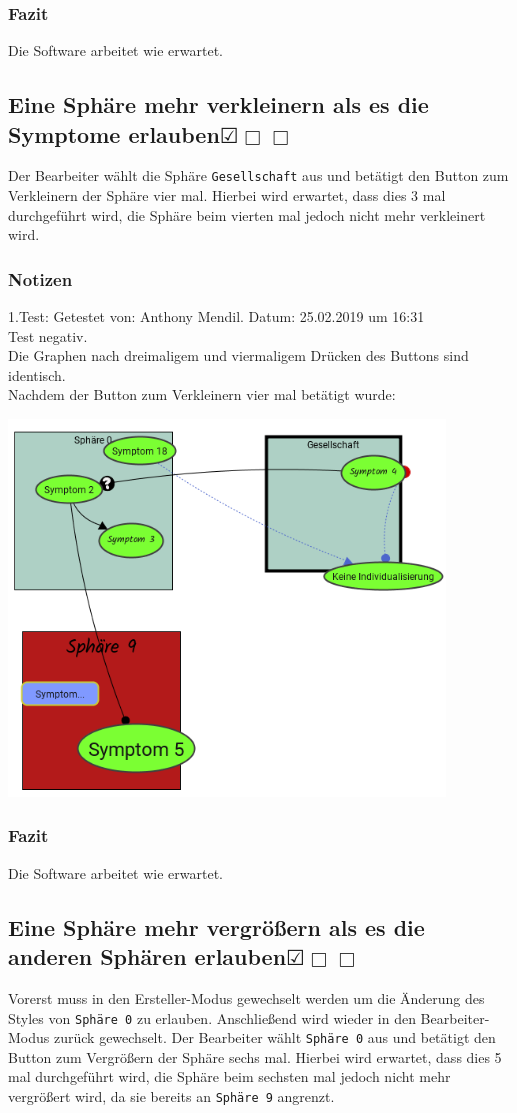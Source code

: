 \documentclass{scrartcl}
\newcommand{\subsectiont}[2]{\subsection[#1]{#1{\normalsize\normalfont #2}}}
\newcommand{\leer}{$\Box$}
\newcommand{\ok}{$\CheckedBox$}
\begin{document}
\subsubsection{Fazit}
Die Software arbeitet wie erwartet.

\subsectiont{Eine Sphäre mehr verkleinern als es die Symptome erlauben}{\dotfill\ok\leer\leer}
Der Bearbeiter wählt die Sphäre \texttt{Gesellschaft} aus und betätigt den Button zum Verkleinern der Sphäre vier mal. Hierbei wird erwartet, dass dies 3 mal durchgeführt wird, die Sphäre beim vierten mal jedoch nicht mehr verkleinert wird. 
\subsubsection{Notizen}
1.Test: Getestet von: Anthony Mendil. Datum: 25.02.2019 um 16:31 \\
Test negativ. \\
Die Graphen nach dreimaligem und viermaligem Drücken des Buttons sind identisch. \\
Nachdem der Button zum Verkleinern vier mal betätigt wurde: 
\begin{center}
\includegraphics[height=10cm]{3_51.PNG}
\end{center}
\subsubsection{Fazit}
Die Software arbeitet wie erwartet.

\subsectiont{Eine Sphäre mehr vergrößern als es die \\anderen Sphären erlauben}{\dotfill\ok\leer\leer}
Vorerst muss in den Ersteller-Modus gewechselt werden um die Änderung des Styles von \texttt{Sphäre 0} zu erlauben. Anschließend wird wieder in den Bearbeiter-Modus zurück gewechselt. Der Bearbeiter wählt \texttt{Sphäre 0} aus und betätigt den Button zum Vergrößern der Sphäre sechs mal. Hierbei wird erwartet, dass dies 5 mal durchgeführt wird, die Sphäre beim sechsten mal jedoch nicht mehr vergrößert wird, da sie bereits an \texttt{Sphäre 9} angrenzt.
\end{document}
